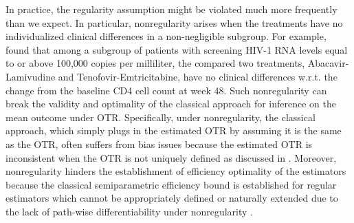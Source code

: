 \documentclass[11pt]{article}
\theoremstyle{referenceplain}
\theoremstyle{referencedefinition}
\theoremstyle{referenceremark}
\begin{document}


In practice, the regularity assumption might be violated much more frequently than we expect. In particular, nonregularity arises when the treatments have no individualized clinical differences in a non-negligible subgroup. For example,  \citet{sax2009abacavir} found that among a subgroup of patients with screening HIV-1 RNA levels equal to or above 100,000 copies per milliliter, the compared two treatments, Abacavir-Lamivudine and Tenofovir-Emtricitabine, have no clinical differences w.r.t. the change from the baseline CD4 cell count at week 48. Such nonregularity can break the validity and optimality of the classical approach for inference on the mean outcome under OTR. Specifically, under nonregularity, the classical approach, which simply plugs in the estimated OTR by assuming it is the same as the OTR, often suffers from bias issues because the estimated OTR is inconsistent when the OTR is not uniquely defined as discussed in  \citet{shi2020breaking}. Moreover, nonregularity hinders the establishment of efficiency optimality of the estimators because the classical semiparametric efficiency bound is established for regular estimators which cannot be appropriately defined or naturally extended due to the lack of path-wise differentiability under nonregularity \citep{van2011targeted,luedtke2016statistical}.
\end{document}
